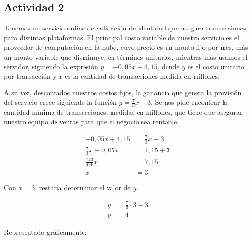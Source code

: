 \subsection*{Actividad 2}

Tenemos un servicio online de validación de identidad que asegura transacciones para distintas plataformas. El principal costo variable de nuestro servicio es el proveedor de computación en la nube, cuyo precio es un monto fijo por mes, más un monto variable que disminuye, en términos unitarios, mientras más usamos el servidor, siguiendo la expresión $y = -0,05x + 4,15$, donde $y$ es el costo unitario por transacción y $x$ es la cantidad de transacciones medida en millones. 

A su vez, descontados nuestros costos fijos, la ganancia que genera la provisión del servicio crece siguiendo la función $y = \frac{7}{3}x - 3$. Se nos pide encontrar la cantidad mínima de transacciones, medidas en millones, que tiene que asegurar nuestro equipo de ventas para que el negocio sea rentable. 

\begin{align*}
	-0,05x + 4,15 &= \frac{7}{3}x - 3\\
	\frac{7}{3}x + 0,05x &= 4,15 + 3\\
	\frac{143}{60}x &= 7,15\\
	x &= 3
\end{align*}

Con $x = 3$, restaría determinar el valor de $y$. 

\begin{align*}
	y &= \frac{7}{3} \cdot 3 - 3\\
	y &= 4
\end{align*}

Representado gráficamente:

